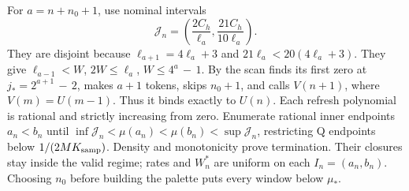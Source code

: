 For \(a=n+n_0+1\), use nominal intervals
\[
 \mathcal J_n=\left(\frac{2C_h}{\ell_a},\frac{21C_h}{10\ell_a}\right).
\]
They are disjoint because \(\ell_{a+1}=4\ell_a+3\) and
\(21\ell_a<20(4\ell_a+3)\). They give
\(\ell_{a-1}<W\), \(2W\le\ell_a\), \(W\le4^a\,-\,1\).
By \cite[Lemmas~4.1 and~4.2]{DMNoise2026} the scan finds its first
zero at \(j_*=2^{a+1}\,-\,2\), makes \(a+1\)
tokens, skips \(n_0+1\), and calls \(V(n+1)\), where
\(V(m)=U(m-1)\). Thus it binds exactly to \(U(n)\).
Each refresh polynomial is rational and strictly increasing from zero.
Enumerate rational inner endpoints \(a_n<b_n\) until
\(\inf\mathcal J_n<\mu(a_n)<\mu(b_n)<\sup\mathcal J_n\), restricting
Q endpoints below \(1/(2MK_{\rm samp})\). Density and monotonicity prove
termination. Their closures stay inside the valid regime; rates and
\(W_n^*\) are uniform on each \(I_n=(a_n,b_n)\).
Choosing \(n_0\) before building the palette puts every window below
\(\mu_*\).

